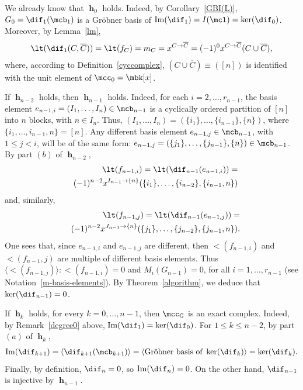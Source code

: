\begin{remark}\label{degree0}
We already know that $\mbfh_0$ holds. Indeed, by
Corollary~\ref{GBI(L)}, $G_0=\dif_1(\mcb_1)$ is a Gr\"obner basis of
${\rm Im}(\dif_1)=I(\mcl)=\ker(\dif_0)$. Moreover, by Lemma~\ref{lm},
\begin{eqnarray*}
\lt(\dif_1(C,\overline{C}))=\lt(f_C)=m_C=x^{C\to\overline{C}}=
(-1)^0x^{C\to\overline{C}}(C\cup\overline{C}),
\end{eqnarray*}
where, according to Definition~\ref{cyccomplex}, $(C\cup
\overline{C})\equiv ([n])$ is identified with the unit element of
$\mcc_0=\mbk[x]$.
\end{remark}

\begin{remark}\label{exactnessn-1}
If $\mbfh_{n-2}$ holds, then $\mbfh_{n-1}$ holds. Indeed, for each
$i=2,\ldots ,r_{n-1}$, the basis element $e_{n-1,i}=(I_1,\ldots
,I_n)\in\mcb_{n-1}$ is a cyclically ordered partition of $[n]$ into
$n$ blocks, with $n\in I_n$. Thus, $(I_1,\ldots ,I_{n})
=(\{i_1\},\ldots ,\{i_{n-1}\},\{n\})$, where $\{i_1,\ldots
,i_{n-1},n\}=[n]$. Any different basis element
$e_{n-1,j}\in\mcb_{n-1}$, with $1\leq j<i$, will be of the same form:
$e_{n-1,j}=(\{j_1\},\ldots ,\{j_{n-1}\},\{n\})\in\mcb_{n-1}$. By part
$(b)$ of $\mbfh_{n-2}$,
\begin{eqnarray*}
&&\lt(f_{n-1,i})= \lt(\dif_{n-1}(e_{n-1,i}))=\\&&
  (-1)^{n-2}x^{I_{n-1}\to\{n\}}(\{i_1\},\ldots
  ,\{i_{n-2}\},\{i_{n-1},n\})
\end{eqnarray*}
and, similarly,
\begin{eqnarray*}
&&\lt(f_{n-1,j})=\lt(\dif_{n-1}(e_{n-1,j}))=\\&&
(-1)^{n-2}x^{J_{n-1}\to\{n\}}(\{j_1\},\ldots
,\{j_{n-2}\},\{j_{n-1},n\}).
\end{eqnarray*}
One sees that, since $e_{n-1,i}$ and $e_{n-1,j}$ are different, then
$\lt(f_{n-1,i})$ and $\lt(f_{n-1},j)$ are multiple of different basis
elements. Thus
$\langle\lt(f_{n-1,j})\rangle:\lt(f_{n-1,i})=0$ and
$M_i(G_{n-1})=0$, for all $i=1,\ldots ,r_{n-1}$ (see
Notation~\ref{m-basis-elements}). By Theorem~\ref{algorithm}, we
deduce that $\ker(\dif_{n-1})=0$.
\end{remark}

\begin{remark}\label{exactness1ton-2}
If $\mbfh_k$ holds, for every $k=0,\ldots ,n-1$, then
$\mcc_{\mathbb{G}}$ is an exact complex. Indeed, by
Remark~\ref{degree0} above, ${\rm Im}(\dif_1)=\ker(\dif_0)$. For
$1\leq k\leq n-2$, by part $(a)$ of $\mbfh_k$,
\begin{eqnarray*}
{\rm Im}(\dif_{k+1})=\langle
\dif_{k+1}(\mcb_{k+1})\rangle=\langle \mbox{Gr\"obner basis of
}\ker(\dif_k)\rangle =\ker(\dif_{k}).
\end{eqnarray*}
Finally, by definition, $\dif_{n}=0$, so ${\rm Im}(\dif_{n})=0$. On
the other hand, $\dif_{n-1}$ is injective by $\mbfh_{n-1}$.
\end{remark}

